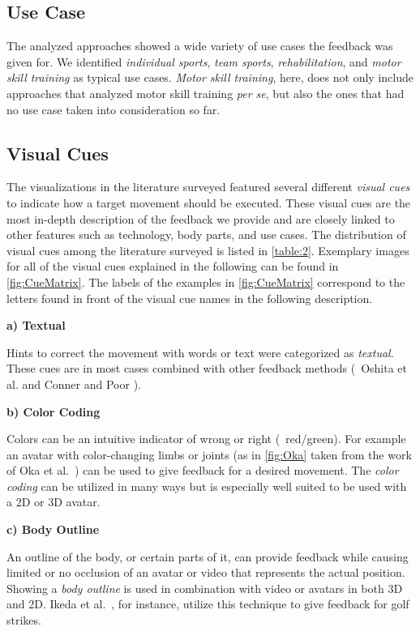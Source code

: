 \subsection*{Use Case}
The analyzed approaches showed a wide variety of use cases the feedback was given for. We identified \textit{individual sports}, \textit{team sports}, \textit{rehabilitation}, and \textit{motor skill training} as typical use cases. \textit{Motor skill training}, here, does not only include approaches that analyzed motor skill training \emph{per se}, but also the ones that had no use case taken into consideration so far.


\subsection*{Visual Cues \label{sec:visualCues}}
The visualizations in the literature surveyed featured several different \textit{visual cues} to indicate how a target movement should be executed. These visual cues are the most in-depth description of the feedback we provide and are closely linked to other features such as technology, body parts, and use cases. The distribution of visual cues among the literature surveyed is listed in \autoref{table:2}. Exemplary images for all of the visual cues explained in the following can be found in \autoref{fig:CueMatrix}. The labels of the examples in  \autoref{fig:CueMatrix} correspond to the letters found in front of the visual cue names in the following description.

\textbf{a) Textual}

Hints to correct the movement with words or text were categorized as \textit{textual}. These cues are in most cases combined with other feedback methods (\eg\ Oshita et al. \cite{oshita2018sts} and Conner and Poor \cite{conner2016cef}).

\textbf{b) Color Coding}

Colors can be an intuitive indicator of wrong or right (\eg\ red/green). For example an avatar with color-changing limbs or joints (as in \autoref{fig:Oka} taken from the work of Oka et al.~\cite{oka2021rtf}) can be used to give feedback for a desired movement. The \textit{color coding} can be utilized in many ways but is especially well suited to be used with a 2D or 3D avatar.

\textbf{c) Body Outline}

An outline of the body, or certain parts of it, can provide feedback while causing limited or no occlusion of an avatar or video that represents the actual position. Showing a \textit{body outline} is used in combination with video or avatars in both 3D and 2D. Ikeda et al.~\cite{ikeda2019rtp}, for instance, utilize this technique to give feedback for golf strikes.

